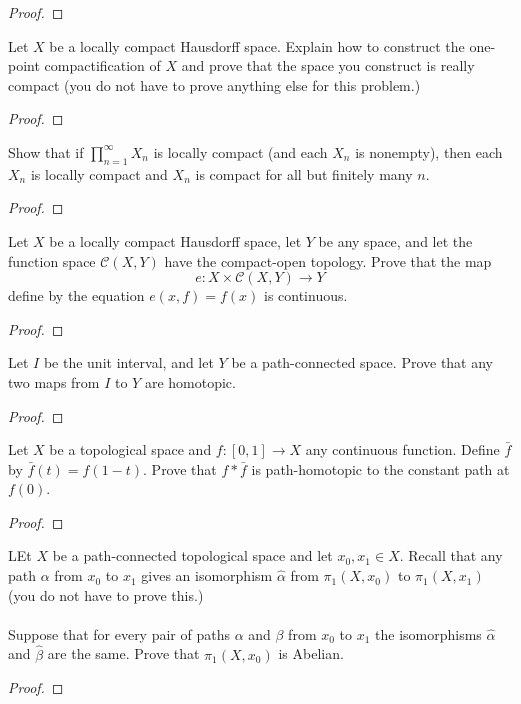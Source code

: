 \begin{proof}
\end{proof}
\begin{problem}
Let $X$ be a locally compact Hausdorff space. Explain how to
construct the one-point compactification of $X$ and prove that
the space you construct is really compact (you do not have to
prove anything else for this problem.)
\end{problem}
\begin{proof}
\end{proof}
\begin{problem}
Show that if $\prod_{n=1}^\infty X_n$ is locally compact (and
each $X_n$ is nonempty), then each $X_n$ is locally compact and
$X_n$ is compact for all but finitely many $n$.
\end{problem}
\begin{proof}
\end{proof}
\begin{problem}
Let $X$ be a locally compact Hausdorff space, let $Y$ be any
space, and let the function space $\mathcal{C}(X,Y)$ have the
compact-open topology. Prove that the map
\[
e\colon X\times\mathcal{C}(X,Y)\to Y
\]
define by the equation $e(x,f)=f(x)$ is continuous.
\end{problem}
\begin{proof}
\end{proof}
\begin{problem}
Let $I$ be the unit interval, and let $Y$ be a path-connected
space. Prove that any two maps from $I$ to $Y$ are homotopic.
\end{problem}
\begin{proof}
\end{proof}
\begin{problem}
Let $X$ be a topological space and $f\colon[0,1]\to X$ any
continuous function. Define $\bar f$ by $\bar f(t)=f(1-t)$. Prove
that $f*\bar f$ is path-homotopic to the constant path at $f(0)$.
\end{problem}
\begin{proof}
\end{proof}
\begin{problem}
LEt $X$ be a path-connected topological space and let $x_0,x_1\in
X$. Recall that any path $\alpha$ from $x_0$ to $x_1$  gives an
isomorphism $\hat\alpha$ from $\pi_1(X,x_0)$ to $\pi_1(X,x_1)$
(you do not have to prove this.)
\\\\
Suppose that for every pair of paths $\alpha$ and $\beta$ from
$x_0$ to $x_1$ the isomorphisms $\hat\alpha$ and $\hat\beta$  are
the same. Prove that $\pi_1(X,x_0)$ is Abelian.
\end{problem}
\begin{proof}
\end{proof}


